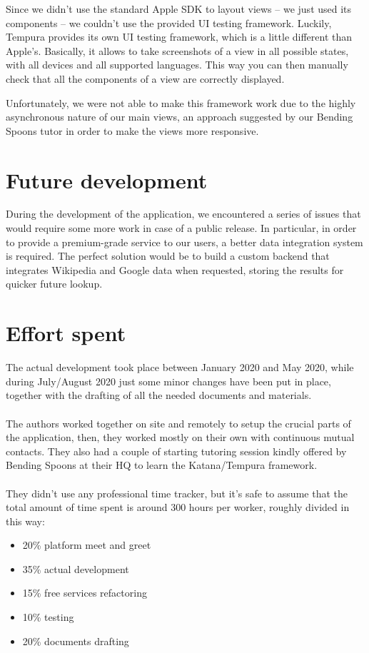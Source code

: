 \documentclass[a4paper, 11pt, parskip=half]{scrreprt}
\theoremstyle{definition}
\begin{document}
Since we didn't use the standard Apple SDK to layout views -- we just used its components -- we couldn't use the provided UI testing framework. Luckily, Tempura provides its own UI testing framework, which is a little different than Apple's. Basically, it allows to take screenshots of a view in all possible states, with all devices and all supported languages. This way you can then manually check that all the components of a view are correctly displayed.

Unfortunately, we were not able to make this framework work due to the highly asynchronous nature of our main views, an approach suggested by our Bending Spoons tutor in order to make the views more responsive.




\chapter{Future development}

During the development of the application, we encountered a series of issues that would require some more work in case of a public release. In particular, in order to provide a premium-grade service to our users, a better data integration system is required. The perfect solution would be to build a custom backend that integrates Wikipedia and Google data when requested, storing the results for quicker future lookup. 





\chapter{Effort spent}

The actual development took place between January 2020 and May 2020, while during July/August 2020 just some minor changes have been put in place, together with the drafting of all the needed documents and materials.
\\\\The authors worked together on site and remotely to setup the crucial parts of the application, then, they worked mostly on their own with continuous mutual contacts. They also had a couple of starting tutoring session kindly offered by Bending Spoons at their HQ to learn the Katana/Tempura framework.
\\\\They didn't use any professional time tracker, but it's safe to assume that the total amount of time spent is around 300 hours per worker, roughly divided in this way:

\begin{itemize}
	\item 20\% platform meet and greet
	\item 35\% actual development
	\item 15\% free services refactoring
	\item 10\% testing
	\item 20\% documents drafting
\end{itemize}
\end{document}
